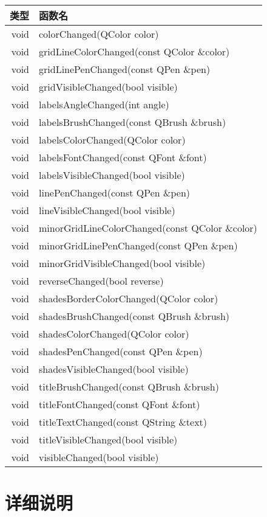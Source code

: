 \begin{tabular}{|r|l|}
\hline 
类型 & 函数名\\
\hline
void&	colorChanged(QColor color)\\
\hline
void&	gridLineColorChanged(const QColor \&color)\\
\hline
void&	gridLinePenChanged(const QPen \&pen)\\
\hline
void&	gridVisibleChanged(bool visible)\\
\hline
void&	labelsAngleChanged(int angle)\\
\hline
void&	labelsBrushChanged(const QBrush \&brush)\\
\hline
void&	labelsColorChanged(QColor color)\\
\hline
void&	labelsFontChanged(const QFont \&font)\\
\hline
void&	labelsVisibleChanged(bool visible)\\
\hline
void&	linePenChanged(const QPen \&pen)\\
\hline
void&	lineVisibleChanged(bool visible)\\
\hline
void&	minorGridLineColorChanged(const QColor \&color)\\
\hline
void&	minorGridLinePenChanged(const QPen \&pen)\\
\hline
void&	minorGridVisibleChanged(bool visible)\\
\hline
void&	reverseChanged(bool reverse)\\
\hline
void&	shadesBorderColorChanged(QColor color)\\
\hline
void&	shadesBrushChanged(const QBrush \&brush)\\
\hline
void&	shadesColorChanged(QColor color)\\
\hline
void&	shadesPenChanged(const QPen \&pen)\\
\hline
void&	shadesVisibleChanged(bool visible)\\
\hline
void&	titleBrushChanged(const QBrush \&brush)\\
\hline
void&	titleFontChanged(const QFont \&font)\\
\hline
void&	titleTextChanged(const QString \&text)\\
\hline
void&	titleVisibleChanged(bool visible)\\
\hline
void&	visibleChanged(bool visible)\\
\hline
\end{tabular}

\section{详细说明}


